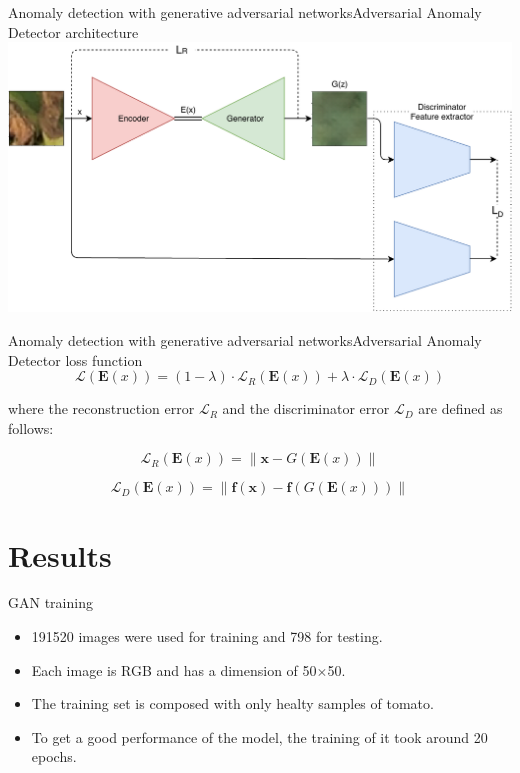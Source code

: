 \documentclass[15pt]{beamer} %
\begin{document}
\begin{frame}{Anomaly detection with generative adversarial networks}{\tiny{Adversarial Anomaly Detector architecture}}
  \includegraphics[width=\textwidth]{adversarial_anomaly_detector}
\end{frame}

\begin{frame}{Anomaly detection with generative adversarial networks}{\tiny{Adversarial Anomaly Detector loss function}}
 \begin{equation}
 \nonumber
 \mathcal{L}\left(\mathbf{E}(x)\right)=(1-\lambda) \cdot \mathcal{L}_{R}\left(\mathbf{E}(x)\right)+\lambda \cdot \mathcal{L}_{D}\left(\mathbf{E}(x)\right)
\end{equation} 

where the reconstruction error $\mathcal{L}_{R}$ and the discriminator error $\mathcal{L}_{D}$ are defined as follows:

\begin{equation}
 \nonumber
 \mathcal{L}_{R}\left(\mathbf{E}(x)\right)=\left\|\mathbf{x}-G\left(\mathbf{E}(x)\right)\right\|
\end{equation}

\begin{equation}
 \nonumber
 \mathcal{L}_{D}\left(\mathbf{E}(x)\right)=\left\|\mathbf{f}(\mathbf{x})-\mathbf{f}\left(G\left(\mathbf{E}(x)\right)\right)\right\|
\end{equation}

\end{frame}

\section{Results}


\begin{frame}{GAN training}
 \begin{itemize}
  \item 191520 images were used for training and 798 for testing.
  \item Each image is RGB and has a dimension of 50$\times$50.
  \item The training set is composed with only healty samples of tomato.
  \item To get a good performance of the model, the training of it took around 20 epochs.
 \end{itemize}

\end{frame}
\end{document}
